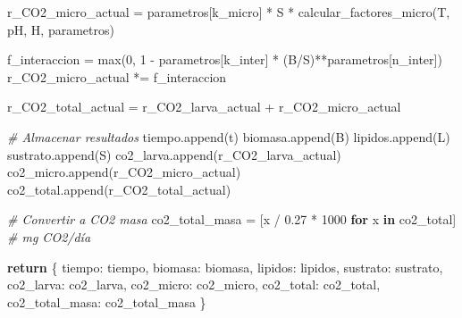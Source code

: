 \documentclass[
]{article}
\newenvironment{Shaded}{}{}
\newcommand{\BuiltInTok}[1]{\textcolor[rgb]{0.00,0.50,0.00}{#1}}
\newcommand{\CommentTok}[1]{\textcolor[rgb]{0.38,0.63,0.69}{\textit{#1}}}
\newcommand{\ControlFlowTok}[1]{\textcolor[rgb]{0.00,0.44,0.13}{\textbf{#1}}}
\newcommand{\DecValTok}[1]{\textcolor[rgb]{0.25,0.63,0.44}{#1}}
\newcommand{\FloatTok}[1]{\textcolor[rgb]{0.25,0.63,0.44}{#1}}
\newcommand{\KeywordTok}[1]{\textcolor[rgb]{0.00,0.44,0.13}{\textbf{#1}}}
\newcommand{\NormalTok}[1]{#1}
\newcommand{\OperatorTok}[1]{\textcolor[rgb]{0.40,0.40,0.40}{#1}}
\newcommand{\StringTok}[1]{\textcolor[rgb]{0.25,0.44,0.63}{#1}}
\begin{document}
\begin{Shaded}
\begin{Highlighting}[]
\NormalTok{        r\_CO2\_micro\_actual }\OperatorTok{=}\NormalTok{ parametros[}\StringTok{\textquotesingle{}k\_micro\textquotesingle{}}\NormalTok{] }\OperatorTok{*}\NormalTok{ S }\OperatorTok{*}\NormalTok{ calcular\_factores\_micro(T, pH, H, parametros)}
        
\NormalTok{        f\_interaccion }\OperatorTok{=} \BuiltInTok{max}\NormalTok{(}\DecValTok{0}\NormalTok{, }\DecValTok{1} \OperatorTok{{-}}\NormalTok{ parametros[}\StringTok{\textquotesingle{}k\_inter\textquotesingle{}}\NormalTok{] }\OperatorTok{*}\NormalTok{ (B}\OperatorTok{/}\NormalTok{S)}\OperatorTok{**}\NormalTok{parametros[}\StringTok{\textquotesingle{}n\_inter\textquotesingle{}}\NormalTok{])}
\NormalTok{        r\_CO2\_micro\_actual }\OperatorTok{*=}\NormalTok{ f\_interaccion}
        
\NormalTok{        r\_CO2\_total\_actual }\OperatorTok{=}\NormalTok{ r\_CO2\_larva\_actual }\OperatorTok{+}\NormalTok{ r\_CO2\_micro\_actual}
        
        \CommentTok{\# Almacenar resultados}
\NormalTok{        tiempo.append(t)}
\NormalTok{        biomasa.append(B)}
\NormalTok{        lipidos.append(L)}
\NormalTok{        sustrato.append(S)}
\NormalTok{        co2\_larva.append(r\_CO2\_larva\_actual)}
\NormalTok{        co2\_micro.append(r\_CO2\_micro\_actual)}
\NormalTok{        co2\_total.append(r\_CO2\_total\_actual)}
    
    \CommentTok{\# Convertir a CO2 masa}
\NormalTok{    co2\_total\_masa }\OperatorTok{=}\NormalTok{ [x }\OperatorTok{/} \FloatTok{0.27} \OperatorTok{*} \DecValTok{1000} \ControlFlowTok{for}\NormalTok{ x }\KeywordTok{in}\NormalTok{ co2\_total]  }\CommentTok{\# mg CO2/día}
    
    \ControlFlowTok{return}\NormalTok{ \{}
        \StringTok{\textquotesingle{}tiempo\textquotesingle{}}\NormalTok{: tiempo,}
        \StringTok{\textquotesingle{}biomasa\textquotesingle{}}\NormalTok{: biomasa,}
        \StringTok{\textquotesingle{}lipidos\textquotesingle{}}\NormalTok{: lipidos,}
        \StringTok{\textquotesingle{}sustrato\textquotesingle{}}\NormalTok{: sustrato,}
        \StringTok{\textquotesingle{}co2\_larva\textquotesingle{}}\NormalTok{: co2\_larva,}
        \StringTok{\textquotesingle{}co2\_micro\textquotesingle{}}\NormalTok{: co2\_micro,}
        \StringTok{\textquotesingle{}co2\_total\textquotesingle{}}\NormalTok{: co2\_total,}
        \StringTok{\textquotesingle{}co2\_total\_masa\textquotesingle{}}\NormalTok{: co2\_total\_masa}
\NormalTok{    \}}
\end{Highlighting}
\end{Shaded}
\end{document}
